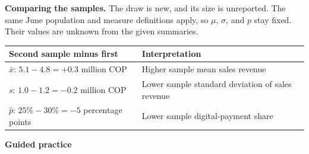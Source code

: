 \smallskip
\textbf{Comparing the samples.}
The draw is new, and its size is unreported. The same June population and
measure definitions apply, so $\mu$, $\sigma$, and $p$ stay fixed. Their values
are unknown from the given summaries.

\begin{tabularx}{\linewidth}{|L|L|}
    \hline
    \textbf{Second sample minus first} & \textbf{Interpretation} \\ \hline
    $\bar{x}$: $5.1-4.8=+0.3$ million COP & Higher sample mean sales revenue \\ \hline
    $s$: $1.0-1.2=-0.2$ million COP & Lower sample standard deviation of sales revenue \\ \hline
    $\hat p$: $25\%-30\%=-5$ percentage points & Lower sample digital-payment share \\ \hline
\end{tabularx}


\begin{center}
	\vspace{-3mm}
	\textbf{Guided practice}
	\vspace{-9mm}
\end{center}




